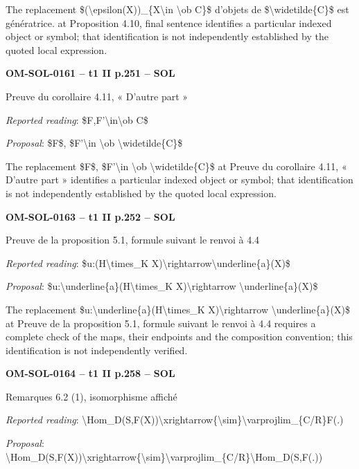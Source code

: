 The replacement \$(\textbackslash{}epsilon(X))\_\{X\textbackslash{}in \textbackslash{}ob C\}\$ d'objets de \$\textbackslash{}widetilde\{C\}\$ est génératrice. at Proposition 4.10, final sentence identifies a particular indexed object or symbol; that identification is not independently established by the quoted local expression.\par
\par\noindent\textbf{OM-SOL-0161 -- t1 II p.251 -- SOL}\par
Preuve du corollaire 4.11, « D'autre part »\par
\emph{Reported reading}: \$F,F'\textbackslash{}in\textbackslash{}ob C\$\par
\emph{Proposal}: \$F\$, \$F'\textbackslash{}in \textbackslash{}ob \textbackslash{}widetilde\{C\}\$\par
The replacement \$F\$, \$F'\textbackslash{}in \textbackslash{}ob \textbackslash{}widetilde\{C\}\$ at Preuve du corollaire 4.11, « D'autre part » identifies a particular indexed object or symbol; that identification is not independently established by the quoted local expression.\par
\par\noindent\textbf{OM-SOL-0163 -- t1 II p.252 -- SOL}\par
Preuve de la proposition 5.1, formule suivant le renvoi à 4.4\par
\emph{Reported reading}: \$u:(H\textbackslash{}times\_K X)\textbackslash{}rightarrow\textbackslash{}underline\{a\}(X)\$\par
\emph{Proposal}: \$u:\textbackslash{}underline\{a\}(H\textbackslash{}times\_K X)\textbackslash{}rightarrow \textbackslash{}underline\{a\}(X)\$\par
The replacement \$u:\textbackslash{}underline\{a\}(H\textbackslash{}times\_K X)\textbackslash{}rightarrow \textbackslash{}underline\{a\}(X)\$ at Preuve de la proposition 5.1, formule suivant le renvoi à 4.4 requires a complete check of the maps, their endpoints and the composition convention; this identification is not independently verified.\par
\par\noindent\textbf{OM-SOL-0164 -- t1 II p.258 -- SOL}\par
Remarques 6.2 (1), isomorphisme affiché\par
\emph{Reported reading}: \textbackslash{}Hom\_D(S,F(X))\textbackslash{}xrightarrow\{\textbackslash{}sim\}\textbackslash{}varprojlim\_\{C/R\}F(.)\par
\emph{Proposal}: \textbackslash{}Hom\_D(S,F(X))\textbackslash{}xrightarrow\{\textbackslash{}sim\}\textbackslash{}varprojlim\_\{C/R\}\textbackslash{}Hom\_D(S,F(.))\par
